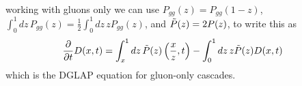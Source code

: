 \documentclass[main.tex]{subfiles}
\begin{document}
working with gluons only we can use \(P_{gg}(z) = P_{gg}(1-z)\), \(\int_0^1 dz\, P_{gg}(z) = \frac{1}{2}\int_0^1 dz\, z P_{gg}(z)\), and \(\Tilde{P}(z) = 2P(z)\), to write this as
\begin{align}
    \frac{\partial}{\partial t} D(x,t) &= \int_x^1 dz \,\Tilde{P}(z)\left(\frac{x}{z},t\right) - \int_0^1 dz\, z \Tilde{P}(z) D(x,t) 
\end{align}
which is the DGLAP equation for gluon-only cascades.
\end{document}
